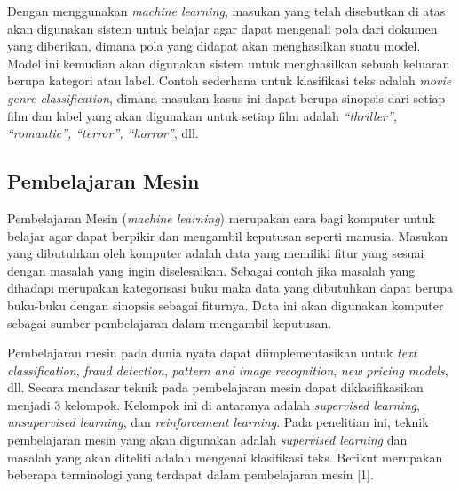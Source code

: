 \indent
Dengan menggunakan {\itshape machine learning}, masukan yang telah disebutkan di atas akan digunakan sistem untuk belajar agar dapat mengenali pola dari dokumen yang diberikan, dimana pola yang didapat akan menghasilkan suatu model. Model ini kemudian akan digunakan sistem untuk menghasilkan sebuah keluaran berupa kategori atau label. Contoh sederhana untuk klasifikasi teks adalah {\itshape movie genre classification}, dimana masukan kasus ini dapat berupa sinopsis dari setiap film dan label yang akan digunakan untuk setiap film adalah {\itshape “thriller”, “romantic”, “terror”, “horror”}, dll.

\subsection{Pembelajaran Mesin}
\indent
Pembelajaran Mesin ({\itshape machine learning}) merupakan cara bagi komputer untuk belajar agar dapat berpikir dan mengambil keputusan seperti manusia. Masukan yang dibutuhkan oleh komputer adalah data yang memiliki fitur yang sesuai dengan masalah yang ingin diselesaikan. Sebagai contoh jika masalah yang dihadapi merupakan kategorisasi buku maka data yang dibutuhkan dapat berupa buku-buku dengan sinopsis sebagai fiturnya. Data ini akan digunakan komputer sebagai sumber pembelajaran dalam mengambil keputusan.

\indent
Pembelajaran mesin pada dunia nyata dapat diimplementasikan untuk {\itshape text classification}, {\itshape fraud detection}, {\itshape pattern and image recognition}, {\itshape new pricing models}, dll. Secara mendasar teknik pada pembelajaran mesin dapat diklasifikasikan menjadi 3 kelompok. Kelompok ini di antaranya adalah {\itshape supervised learning}, {\itshape unsupervised learning}, dan {\itshape reinforcement learning}. Pada penelitian ini, teknik pembelajaran mesin yang akan digunakan adalah {\itshape supervised learning} dan masalah yang akan diteliti adalah mengenai klasifikasi teks. Berikut merupakan beberapa terminologi yang terdapat dalam pembelajaran mesin [1].

